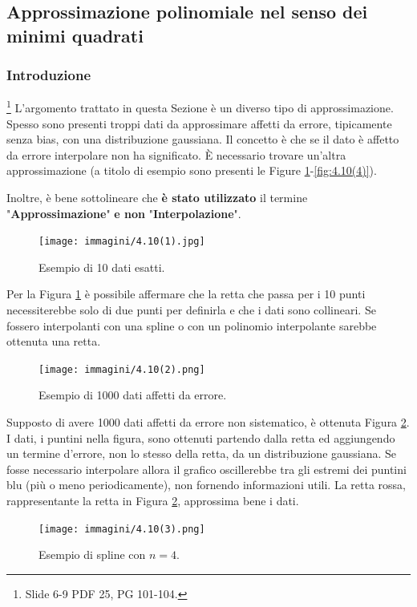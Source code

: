 \subsection{Approssimazione polinomiale nel senso dei minimi quadrati}\label{ssec:approssimazione_polinomiale_minimi_quadrati}
\subsubsection{Introduzione}
\footnote{Slide 6-9 PDF 25, PG 101-104.}
L'argomento trattato in questa Sezione è un diverso tipo di approssimazione. Spesso sono presenti troppi dati da approssimare affetti da errore, tipicamente senza bias, con una distribuzione gaussiana. Il concetto è che se il dato è affetto da errore interpolare non ha significato. È necessario trovare un'altra approssimazione (a titolo di esempio sono presenti le Figure \ref{fig:4.10(1)}-\ref{fig:4.10(4)}).

Inoltre, è bene sottolineare che \textbf{è stato utilizzato} il termine "\textbf{Approssimazione}" \textbf{e non} "\textbf{Interpolazione}".

\begin{figure}
    \centering
    \texttt{[image: immagini/4.10(1).jpg]}
    \caption{Esempio di 10 dati esatti.}
    \label{fig:4.10(1)}
\end{figure}

Per la Figura \ref{fig:4.10(1)} è possibile affermare che la retta che passa per i 10 punti necessiterebbe solo di due punti per definirla e che i dati sono collineari. Se fossero interpolanti con una spline o con un polinomio interpolante sarebbe ottenuta una retta.

\begin{figure}
    \centering
    \texttt{[image: immagini/4.10(2).png]}
    \caption{Esempio di 1000 dati affetti da errore.}\label{fig:4.10(2)}
\end{figure}

Supposto di avere 1000 dati affetti da errore non sistematico, è ottenuta Figura \ref{fig:4.10(2)}. I dati, i puntini nella figura, sono ottenuti partendo dalla retta ed aggiungendo un termine d'errore, non lo stesso della retta, da un distribuzione gaussiana. Se fosse necessario interpolare allora il grafico oscillerebbe tra gli estremi dei puntini blu (più o meno periodicamente), non fornendo informazioni utili. La retta rossa, rappresentante la retta in Figura \ref{fig:4.10(2)}, approssima bene i dati.

\begin{figure}
    \centering
    \texttt{[image: immagini/4.10(3).png]}
    \caption{Esempio di spline con $n=4$.}\label{fig:4.10(3)}
\end{figure}

